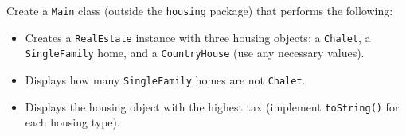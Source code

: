 Create a \texttt{Main} class (outside the \texttt{housing} package) that performs the following:

\begin{itemize}

    \item Creates a \texttt{RealEstate} instance with three housing objects: a \texttt{Chalet}, a \texttt{SingleFamily} home, and a \texttt{CountryHouse} (use any necessary values).

    \item Displays how many \texttt{SingleFamily} homes are not \texttt{Chalet}.

    \item Displays the housing object with the highest tax (implement \texttt{toString()} for each housing type).

\end{itemize}
